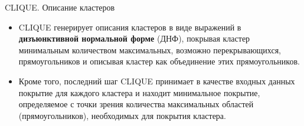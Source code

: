 \documentclass[unicode, notheorems, handout]{beamer}
\begin{document}
\begin{frame}{CLIQUE. Описание кластеров}
\small

\begin{itemize}


    \item CLIQUE генерирует описания кластеров в виде выражений в \textbf{дизъюнктивной нормальной форме} (ДНФ), покрывая кластер минимальным количеством максимальных, возможно перекрывающихся, прямоугольников и описывая кластер как объединение этих прямоугольников. 




    \item Кроме того, последний шаг CLIQUE принимает в качестве входных данных покрытие для каждого кластера и находит минимальное покрытие, определяемое с точки зрения количества максимальных областей (прямоугольников), необходимых для покрытия кластера.
\end{itemize}
\end{frame}
\end{document}
